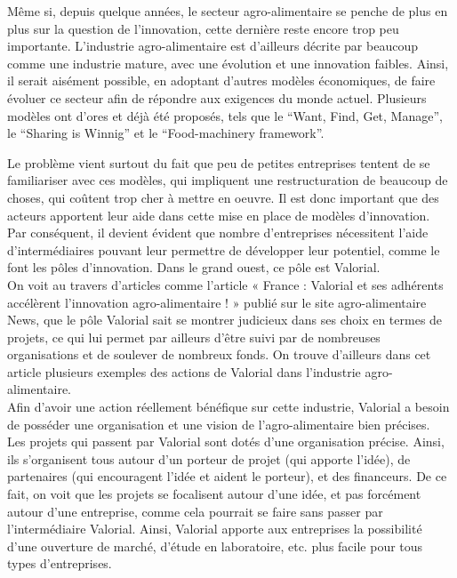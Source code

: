 \documentclass[a4paper,12pt]{report}
\begin{document}
	Même si, depuis quelque années, le secteur agro-alimentaire se penche de plus en plus sur la question de l’innovation, cette dernière reste encore trop peu importante. L’industrie agro-alimentaire est d’ailleurs décrite par beaucoup comme une industrie mature, avec une évolution et une innovation faibles. Ainsi, il serait aisément possible, en adoptant d’autres modèles économiques, de faire évoluer ce secteur afin de répondre aux exigences du monde actuel. Plusieurs modèles ont d’ores et déjà été proposés, tels que le “Want, Find, Get, Manage”, le “Sharing is Winnig” et le “Food-machinery framework”.
	
	Le problème vient surtout du fait que peu de petites entreprises tentent de se familiariser avec ces modèles, qui impliquent une restructuration de beaucoup de choses, qui coûtent trop cher à mettre en oeuvre. Il est donc important que des acteurs apportent leur aide dans cette mise en place de modèles d’innovation.\\

	 Par conséquent, il devient évident que nombre d’entreprises nécessitent l’aide d’intermédiaires pouvant leur permettre de développer leur potentiel, comme le font les pôles d’innovation. Dans le grand ouest, ce pôle est Valorial.\\

	On voit au travers d'articles comme l'article « France : Valorial et ses adhérents accélèrent l'innovation agro-alimentaire ! » publié sur le site agro-alimentaire News, que le pôle Valorial sait se montrer judicieux dans ses choix en termes de projets, ce qui lui permet par ailleurs d'être suivi par de nombreuses organisations et de soulever de nombreux fonds. On trouve d’ailleurs dans cet article plusieurs exemples des actions de Valorial dans l’industrie agro-alimentaire.\\

	Afin d’avoir une action réellement bénéfique sur cette industrie, Valorial a besoin de posséder une organisation et une vision de l’agro-alimentaire bien précises.\\

	Les projets qui passent par Valorial sont dotés d’une organisation précise. Ainsi, ils s’organisent tous autour d’un porteur de projet (qui apporte l’idée), de partenaires (qui encouragent l’idée et aident le porteur), et des financeurs. De ce fait, on voit que les projets se focalisent autour d’une idée, et pas forcément autour d’une entreprise, comme cela pourrait se faire sans passer par l’intermédiaire Valorial. Ainsi, Valorial apporte aux entreprises la possibilité d’une ouverture de marché, d’étude en laboratoire, etc. plus facile pour tous types d’entreprises. 
\end{document}
